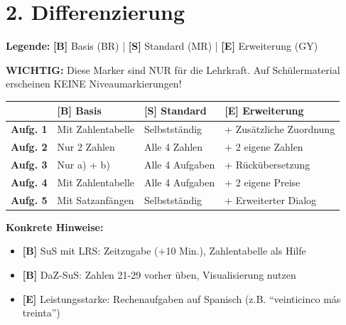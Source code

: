 \documentclass[11pt, a4paper]{article}
\newcommand{\B}{\textcolor{basis}{\textbf{[B]}}}
\newcommand{\Std}{\textcolor{standard}{\textbf{[S]}}}
\newcommand{\E}{\textcolor{erweiterung}{\textbf{[E]}}}
\begin{document}

\section*{2. Differenzierung}

\begin{differenzierung}
\textbf{Legende:} \B{} Basis (BR) | \Std{} Standard (MR) | \E{} Erweiterung (GY)

\vspace{0.5em}

\textbf{WICHTIG:} Diese Marker sind NUR für die Lehrkraft. Auf Schülermaterial erscheinen KEINE Niveaumarkierungen!
\end{differenzierung}

\vspace{1em}

\begin{tabularx}{\textwidth}{|l|X|X|X|}
\hline
& \B{} \textbf{Basis} & \Std{} \textbf{Standard} & \E{} \textbf{Erweiterung} \\
\hline
\textbf{Aufg. 1} & Mit Zahlentabelle & Selbstständig & + Zusätzliche Zuordnung \\
\hline
\textbf{Aufg. 2} & Nur 2 Zahlen & Alle 4 Zahlen & + 2 eigene Zahlen \\
\hline
\textbf{Aufg. 3} & Nur a) + b) & Alle 4 Aufgaben & + Rückübersetzung \\
\hline
\textbf{Aufg. 4} & Mit Zahlentabelle & Alle 4 Aufgaben & + 2 eigene Preise \\
\hline
\textbf{Aufg. 5} & Mit Satzanfängen & Selbstständig & + Erweiterter Dialog \\
\hline
\end{tabularx}

\vspace{1em}

\textbf{Konkrete Hinweise:}
\begin{itemize}
    \item \B{} SuS mit LRS: Zeitzugabe (+10 Min.), Zahlentabelle als Hilfe
    \item \B{} DaZ-SuS: Zahlen 21-29 vorher üben, Visualisierung nutzen
    \item \E{} Leistungsstarke: Rechenaufgaben auf Spanisch (z.B. ``veinticinco más treinta'')
\end{itemize}

\end{document}
